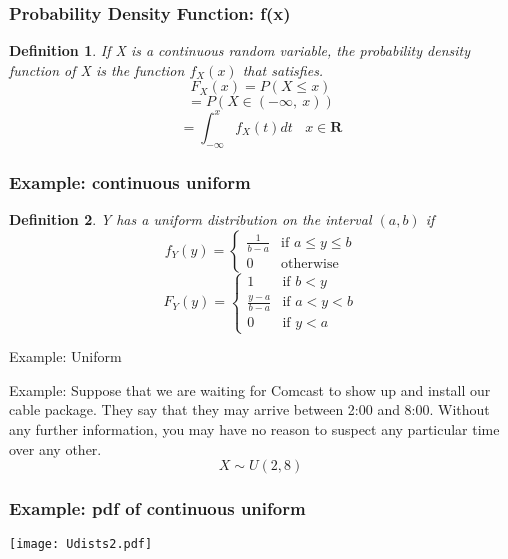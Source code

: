\documentclass[aspectratio=169, handout]{beamer}
\newtheorem{defn}{Definition}
\numberwithin{equation}{section}
\begin{document}
\begin{frame}
\frametitle{Probability Density Function: f(x)}
\begin{defn}
If X is a continuous random variable, the probability density function of X is the function $f_X(x)$ that satisfies.
$$F_X(x)=P(X\leq x)$$
$$=P(X\in (-\infty,\ x))$$
$$=\int_{-\infty}^{x} f_X(t)dt\ \ \ \ x\in \textbf{R}$$
\end{defn}
\pause

\begin{center}
\end{center}
\end{frame}



\begin{frame}
\frametitle{Example: continuous uniform}

\begin{defn}
Y has a uniform distribution on the interval $(a,b)$ if
$$f_Y(y)=\begin{cases} \frac{1}{b-a}& \text{if } a\leq y\leq b\\ 0 & \text{otherwise} \end{cases}$$
$$F_Y(y)=\begin{cases} 1 & \text{if } b<y\\\frac{y-a}{b-a}& \text{if } a<y<b\\ 0 & \text{if } y<a\ \end{cases}$$
\end{defn}

\end{frame}
\begin{frame}{Example: Uniform}

Example: Suppose that we are waiting for Comcast to show up and install our cable package.  They say that they may arrive between 2:00 and 8:00.  Without any further information, you may have no reason to suspect any particular time over any other.
$$X\sim U(2,8)$$

\end{frame}



\begin{frame}
\frametitle{Example: pdf of continuous uniform}
\begin{center}
\texttt{[image: Udists2.pdf]}
\end{center}

\end{frame}
\end{document}
